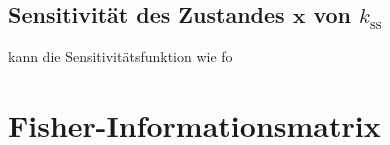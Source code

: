 \subsection{Sensitivität des Zustandes $\pmb{x}$ von $k_\mathrm{ss}$}

kann die Sensitivitätsfunktion wie fo 


\section{Fisher-Informationsmatrix}




